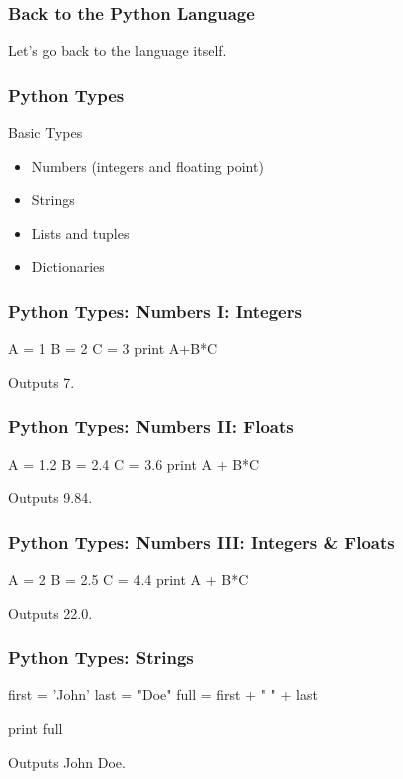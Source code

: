 \begin{frame}[fragile]
\frametitle{Back to the Python Language}
Let's go back to the language itself.
\end{frame}

\begin{frame}[fragile]
\frametitle{Python Types}
\begin{block}{Basic Types}
\begin{itemize}
\item Numbers (integers and floating point)
\item Strings
\item Lists and tuples
\item Dictionaries
\end{itemize}
\end{block}
\end{frame}


\begin{frame}[fragile]
\frametitle{Python Types: Numbers I: Integers}
\begin{python}
A = 1
B = 2
C = 3
print A+B*C
\end{python}

Outputs \alert{7}.
\end{frame}

\begin{frame}[fragile]
\frametitle{Python Types: Numbers II: Floats}
\begin{python}
A = 1.2
B = 2.4
C = 3.6
print A + B*C
\end{python}

Outputs \alert{9.84}.
\end{frame}

\begin{frame}[fragile]
\frametitle{Python Types: Numbers III: Integers \& Floats}
\begin{python}
A = 2
B = 2.5
C = 4.4
print A + B*C
\end{python}

Outputs \alert{22.0}.
\end{frame}

\begin{frame}[fragile]
\frametitle{Python Types: Strings}

\begin{python}
first = 'John'
last = "Doe"
full = first + " " + last

print full
\end{python}

\pause
Outputs \alert{John Doe}.
\end{frame}

